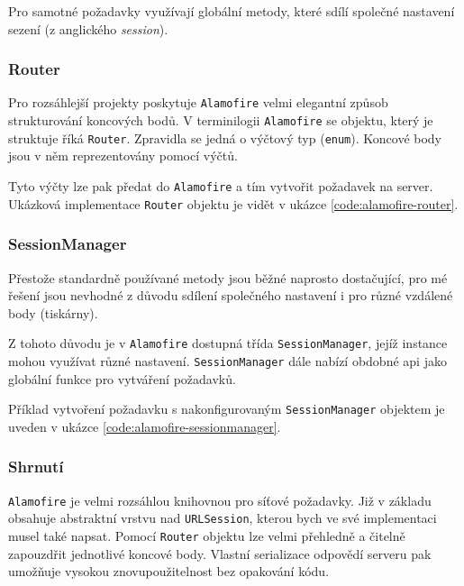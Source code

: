 Pro samotné požadavky využívají globální metody, které sdílí společné nastavení sezení (z anglického \textit{session}).

\subsubsection*{Router}

Pro rozsáhlejší projekty poskytuje \texttt{Alamofire} velmi elegantní způsob strukturování koncových bodů.
V terminilogii \texttt{Alamofire} se objektu, který je struktuje říká \texttt{Router}.
Zpravidla se jedná o výčtový typ (\texttt{enum}).
Koncové body jsou v něm reprezentovány pomocí výčtů.

Tyto výčty lze pak předat do \texttt{Alamofire} a tím vytvořit požadavek na server.
Ukázková implementace \texttt{Router} objektu je vidět v ukázce \ref{code:alamofire-router}.


\subsubsection*{SessionManager}

Přestože standardně používané metody jsou běžné naprosto dostačující, pro mé řešení jsou nevhodné z důvodu sdílení společného nastavení i pro různé vzdálené body (tiskárny).

Z tohoto důvodu je v \texttt{Alamofire} dostupná třída \texttt{SessionManager}, jejíž instance mohou využívat různé nastavení.
\texttt{SessionManager} dále nabízí obdobné \acrshort{api} jako globální funkce pro vytváření požadavků.

Příklad vytvoření požadavku s nakonfigurovaným \texttt{SessionManager} objektem je uveden v ukázce \ref{code:alamofire-sessionmanager}.


\subsubsection*{Shrnutí}

\texttt{Alamofire} je velmi rozsáhlou knihovnou pro síťové požadavky.
Již v základu obsahuje abstraktní vrstvu nad \texttt{URLSession}, kterou bych ve své implementaci musel také napsat.
Pomocí \texttt{Router} objektu lze velmi přehledně a čitelně zapouzdřit jednotlivé koncové body.
Vlastní serializace odpovědí serveru pak umožňuje vysokou znovupoužitelnost bez opakování kódu.

